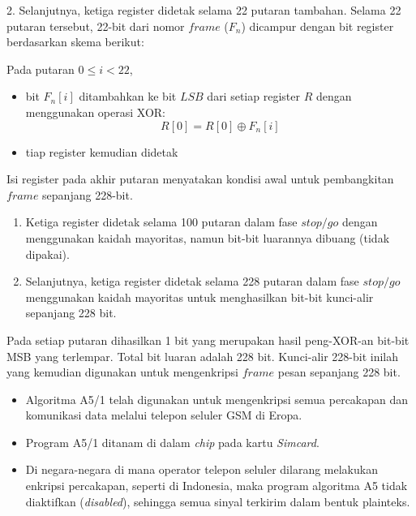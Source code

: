 \documentclass{article}
\begin{document}
\newpage


2. Selanjutnya, ketiga register didetak selama 22 putaran tambahan. Selama 22 putaran tersebut, 22-bit dari nomor $frame$ ($F_n$) dicampur dengan bit register berdasarkan skema berikut:

Pada putaran $0 \le i < 22$,

\begin{itemize}
    \item bit $F_n[i]$ ditambahkan ke bit $LSB$ dari setiap register $R$ dengan menggunakan operasi XOR:
    \[ R[0] = R[0] \oplus F_n[i] \]
    \item tiap register kemudian didetak
\end{itemize}

Isi register pada akhir putaran menyatakan kondisi awal untuk pembangkitan $frame$ sepanjang 228-bit.

\newpage


\begin{enumerate}
  \item[3.] Ketiga register didetak selama 100 putaran dalam fase $stop/go$ dengan menggunakan kaidah mayoritas, namun bit-bit luarannya dibuang (tidak dipakai).
  \item[4.] Selanjutnya, ketiga register didetak selama 228 putaran dalam fase $stop/go$ menggunakan kaidah mayoritas untuk menghasilkan bit-bit kunci-alir sepanjang 228 bit.
\end{enumerate}

Pada setiap putaran dihasilkan 1 bit yang merupakan hasil peng-XOR-an bit-bit MSB yang terlempar. Total bit luaran adalah 228 bit. Kunci-alir 228-bit inilah yang kemudian digunakan untuk mengenkripsi $frame$ pesan sepanjang 228 bit.

\newpage


\begin{itemize}
    \item Algoritma A5/1 telah digunakan untuk mengenkripsi semua percakapan dan komunikasi data melalui telepon seluler GSM di Eropa.
    \item Program A5/1 ditanam di dalam \textit{chip} pada kartu \textit{Simcard}.
    \item Di negara-negara di mana operator telepon seluler dilarang melakukan enkripsi percakapan, seperti di Indonesia, maka program algoritma A5 tidak diaktifkan (\textit{disabled}), sehingga semua sinyal terkirim dalam bentuk plainteks.
\end{itemize}
\end{document}
